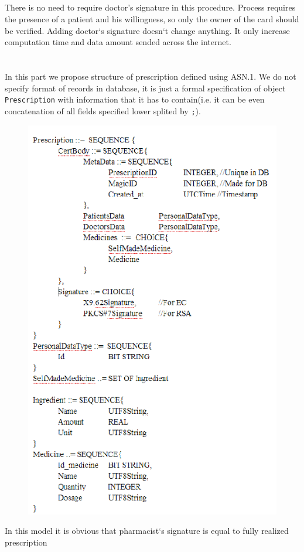 \section {}
There is no need to require doctor's signature in this procedure. Process requires the presence of a patient and his willingness, so only the owner of the card should be verified. Adding doctor`s signature doesn`t change anything. It only increase computation time and data amount sended across the internet. 

\chapter {}
In this part we propose structure of prescription defined using ASN.1. We do not specify format of records in database, it is just a formal specification of object \texttt{ Prescription} with information that it has to contain(i.e. it can be even concatenation of all fields specified lower splited by \texttt{;}).

\begin{figure}[h]
\centering
\includegraphics[width=\textwidth,height=\textheight,keepaspectratio]{doctor/asn1.png}
\end{figure} 
In this model it is obvious that pharmacist`s signature is equal to fully realized prescription


